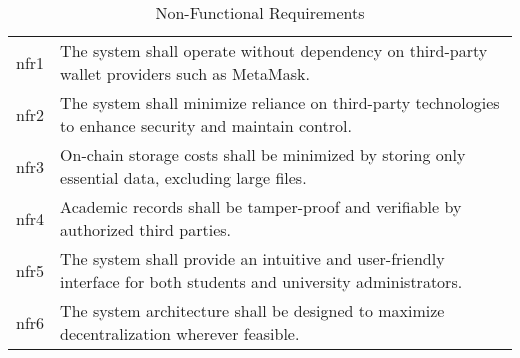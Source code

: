 \begin{table}
\centering
\caption{Non-Functional Requirements}
\label{tab:nonFuncReq}
\begin{tabular}{|p{1.0cm}|p{11cm}|}
\hline
\gls{nfr}1 & The system shall operate without dependency on third-party wallet providers such as MetaMask. \\
\gls{nfr}2 & The system shall minimize reliance on third-party technologies to enhance security and maintain control. \\
\gls{nfr}3 & On-chain storage costs shall be minimized by storing only essential data, excluding large files. \\
\gls{nfr}4 & Academic records shall be tamper-proof and verifiable by authorized third parties. \\
\gls{nfr}5 & The system shall provide an intuitive and user-friendly interface for both students and university administrators. \\
\gls{nfr}6 & The system architecture shall be designed to maximize decentralization wherever feasible. \\
\hline
\end{tabular}
\end{table}